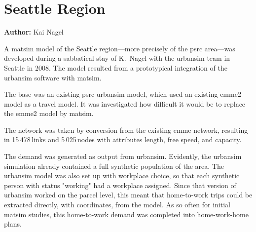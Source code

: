 \section{Seattle Region}
\label{sec:seattle}
\hfill \textbf{Author:} Kai Nagel

A \gls{matsim} model of the Seattle region---more precisely of the \gls{psrc} area---was developed during a sabbatical stay of K.\ Nagel with the \gls{urbansim} team in Seattle in 2008. The model resulted from a prototypical integration of the \gls{urbansim} software \citep[e.g.,][]{WaddellEtc2003UrbanSim} with \gls{matsim}. 

The base was an existing \gls{psrc} \gls{urbansim} model, which used an existing \gls{emme2} model 
as a travel model. It was investigated how difficult it would be to replace the \gls{emme2} model by \gls{matsim}. 

The network was taken by conversion from the existing \gls{emme} network, resulting in 15\,478\,links and 5\,025\,nodes with attributes length, free speed, and capacity.

The demand was generated as output from \gls{urbansim}. Evidently, the \gls{urbansim} simulation already contained a full synthetic population of the area. The \gls{urbansim} model was also set up with workplace choice, so that each synthetic person with status "working" had a workplace assigned. Since that version of \gls{urbansim} worked on the parcel level, this meant that home-to-work trips could be extracted directly, with coordinates, from the model. As so often for initial \gls{matsim}  studies, this home-to-work demand was completed into home-work-home plans.

